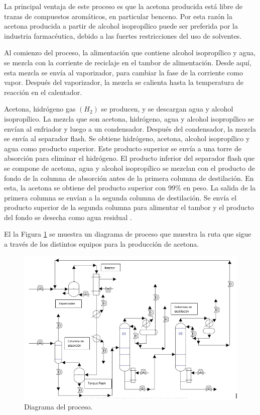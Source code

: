\begin{multicols}{2}
\end{multicols}

    La principal ventaja de este proceso es que la acetona producida está libre de trazas de compuestos aromáticos, en particular benceno. Por esta razón la acetona producida a partir de alcohol isopropílico puede ser preferida por la industria farmacéutica, debido a las fuertes restricciones del uso de solventes.

    Al comienzo del proceso, la alimentación que contiene alcohol isopropílico y agua,  se mezcla con  la corriente de reciclaje  en el tambor de alimentación. Desde aquí, esta mezcla se envía al vaporizador, para cambiar la fase de la corriente como vapor. Después del vaporizador, la mezcla se calienta hasta la temperatura de reacción en el calentador.

    Acetona, hidrógeno gas $(H_2)$ se producen, y se descargan agua y alcohol isopropílico. La mezcla que son acetona, hidrógeno, agua y alcohol isopropílico se envían al enfriador y luego a un condensador. Después del condensador, la mezcla se envía al separador flash. Se obtiene hidrógeno, acetona, alcohol isopropílico y agua como producto superior. Este producto superior se envía a una torre de absorción para eliminar el hidrógeno. El producto inferior del separador flash que se compone de acetona, agua y alcohol isopropílico se mezclan con el producto de fondo de la columna de absorción antes de la primera columna de destilación. En esta, la acetona se obtiene del producto superior con 99\% en peso. La salida de la primera columna se envían a la segunda columna de destilación. Se envía el producto superior de la segunda columna para alimentar el tambor y el producto del fondo se desecha como agua residual \cite{article}.

    El la Figura \ref{fig:Diagrama} se muestra un diagrama  de proceso que muestra la ruta que sigue a través de los distintos equipos para la producción de acetona.
        \begin{figure}[H]
            \centering
            \includegraphics[scale = 0.55]{images/Diagrama_CAD.png}
            \caption{Diagrama del proceso.}
            \label{fig:Diagrama}
        \end{figure}

